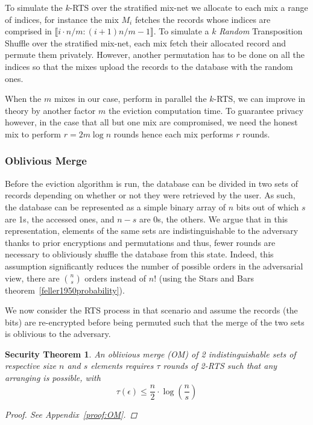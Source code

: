 \documentclass[USenglish,oneside,twocolumn]{article}
\newtheorem{secthm}{Security Theorem}
\begin{document}
To simulate the $k$-RTS over the stratified mix-net we allocate to each mix a range of indices, for instance the mix $M_i$ fetches the records whose indices are comprised in $\llbracket i\cdot n/m : (i+1)n/m -1 \rrbracket$. To simulate a $k$ \emph{Random} Transposition Shuffle over the stratified mix-net, each mix fetch their allocated record and permute them privately. However, another permutation has to be done on all the indices so that the mixes upload the records to the database with the random ones. 

When the $m$ mixes in our case, perform in parallel the $k$-RTS, we can improve in theory by another factor $m$ the eviction computation time. To guarantee privacy however, in the case that all but one mix are compromised, we need the honest mix to perform $r=2 m\log n$ rounds hence each mix performs $r$ rounds.
%
\subsubsection{Oblivious Merge}\label{OM}
Before the eviction algorithm is run, the database can be divided in two sets of records depending on whether or not they were retrieved by the user. As such, the database can be represented as a simple binary array of $n$ bits out of which $s$ are 1s, the accessed ones, and $n-s$ are 0s, the others.
We argue that in this representation, elements of the same sets are indistinguishable to the adversary thanks to prior encryptions and permutations and thus, fewer rounds are necessary to obliviously shuffle the database from this state. Indeed, this assumption significantly reduces the number of possible orders in the adversarial view, there are  ${n \choose s}$ orders instead of $n!$ (using the Stars and Bars theorem~\ref{feller1950probability}).

We now consider the RTS process in that scenario and assume the records (the bits) are re-encrypted before being permuted such that the merge of the two sets is oblivious to the adversary.

\begin{secthm}
An oblivious merge (OM) of 2 indistinguishable sets of respective size $n$ and $s$ elements requires $\tau$ rounds of 2-RTS such that any arranging is possible, with
$$\tau(\epsilon) \leq \frac{n}{2}  \cdot \log \left (\frac{n}{s}\right)$$%
\begin{proof}
See Appendix~\ref{proof:OM}.
\end{proof}
\end{secthm}
\end{document}
